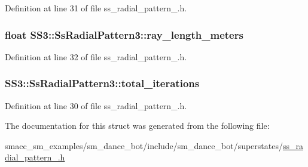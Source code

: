 Definition at line 31 of file ss\+\_\+radial\+\_\+pattern\+\_.\+h.

\subsubsection[{\texorpdfstring{ray\+\_\+length\+\_\+meters}{ray_length_meters}}]{\setlength{\rightskip}{0pt plus 5cm}float S\+S3\+::\+Ss\+Radial\+Pattern3\+::ray\+\_\+length\+\_\+meters}\hypertarget{structSS3_1_1SsRadialPattern3_ab66a6178cf623df46838396a696d401e}{}\label{structSS3_1_1SsRadialPattern3_ab66a6178cf623df46838396a696d401e}


Definition at line 32 of file ss\+\_\+radial\+\_\+pattern\+\_.\+h.

\subsubsection[{\texorpdfstring{total\+\_\+iterations}{total_iterations}}]{ S\+S3\+::\+Ss\+Radial\+Pattern3\+::total\+\_\+iterations}\hypertarget{structSS3_1_1SsRadialPattern3_a6f4e7e7854d2bb183e8a98caca3e1a4c}{}\label{structSS3_1_1SsRadialPattern3_a6f4e7e7854d2bb183e8a98caca3e1a4c}


Definition at line 30 of file ss\+\_\+radial\+\_\+pattern\+\_.\+h.



The documentation for this struct was generated from the following file\+:\begin{DoxyCompactItemize}
\item 
smacc\+\_\+sm\+\_\+examples/sm\+\_\+dance\+\_\+bot/include/sm\+\_\+dance\+\_\+bot/superstates/\hyperlink{ss__radial__pattern__3_8h}{ss\+\_\+radial\+\_\+pattern\+\_.\+h}\end{DoxyCompactItemize}
